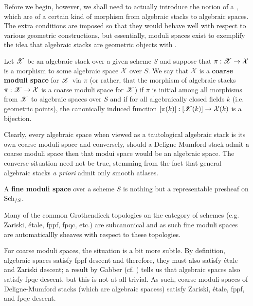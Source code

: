             Before we begin, however, we shall need to actually introduce the notion of a , which are of a certain kind of morphism from algebraic stacks to algebraic spaces. The extra conditions are imposed so that they would behave well with respect to various geometric constructions, but essentially, moduli spaces exist to exemplify the idea that algebraic stacks are geometric objects with .
            \begin{definition} \label{def: coarse_moduli_spaces}
                \cite[Section 1, pp. 1]{conrad_keel_mori_theorem_via_stacks} Let $\mathscr{X}$ be an algebraic stack over a given scheme $S$ and suppose that $\pi: \mathscr{X} \to \mathcal{X}$ is a morphism to some algebraic space $\mathcal{X}$ over $S$. We say that $\mathcal{X}$ is a \textbf{coarse moduli space} for $\mathscr{X}$ via $\pi$ (or rather, that the morphism of algebraic stacks $\pi: \mathscr{X} \to \mathcal{X}$ is a coarse moduli space for $\mathscr{X}$) if $\pi$ is initial among all morphisms from $\mathscr{X}$ to algebraic spaces over $S$ and if for all algebraically closed fields $k$ (i.e. geometric points), the canonically induced function $[\pi(k)]: [\mathscr{X}(k)] \to \mathcal{X}(k)$ is a bijection.  
            \end{definition}
            \begin{remark} \label{remark: (non)representability_of_coarse_moduli_spaces}
                Clearly, every algebraic space when viewed as a tautological algebraic stack is its own coarse moduli space and conversely, should a Deligne-Mumford stack admit a coarse moduli space then that modui space would be an algebraic space. The converse situation need not be true, stemming from the fact that general algebraic stacks \textit{a priori} admit only smooth atlases. 
            \end{remark}
            \begin{definition} \label{def: fine_moduli_spaces}
                A \textbf{fine moduli space} over a scheme $S$ is nothing but a representable presheaf on $\mathrm{Sch}_{/S}$.
            \end{definition}
            \begin{remark} \label{remark: sheafiness_of_moduli_spaces}
                Many of the common Grothendieck topologies on the category of schemes (e.g. Zariski, \'etale, fppf, fpqc, etc.) are subcanonical and as such fine moduli spaces are automaticallly sheaves with respect to these topologies. 
                
                For coarse moduli spaces, the situation is a bit more subtle. By definition, algebraic spaces satisfy fppf descent and therefore, they must also satisfy \'etale and Zariski descent; a result by Gabber (cf. \cite[\href{https://stacks.math.columbia.edu/tag/0APL}{Tag 0APL}]{stacks-project}) tells us that algebraic spaces also satisfy fpqc descent, but this is not at all trivial. As such, coarse moduli spaces of Deligne-Mumford stacks (which are algebraic spacess) satisfy Zariski, \'etale, fppf, and fpqc descent. 
            \end{remark}
